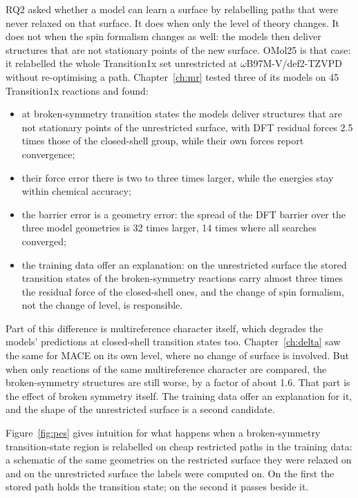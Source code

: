 RQ2 asked whether a model can learn a surface by relabelling paths
that were never relaxed on that surface. It does when only the level
of theory changes. It does not when the spin formalism changes as
well: the models then deliver structures that are not stationary
points of the new surface. OMol25 is
that case: it relabelled the whole Transition1x set unrestricted at
\mbox{$\omega$B97M-V/def2-TZVPD} without re-optimising a path.
Chapter~\ref{ch:mr} tested three of its models on 45 Transition1x
reactions and found:

\begin{itemize}
  \item at broken-symmetry transition states the models deliver
    structures that are not stationary points of the unrestricted
    surface, with DFT residual forces 2.5 times those of the
    closed-shell group, while their own forces report convergence;
  \item their force error there is two to three times larger, while
    the energies stay within chemical accuracy;
  \item the barrier error is a geometry error: the spread of the DFT
    barrier over the three model geometries is 32 times larger, 14
    times where all searches converged;
  \item the training data offer an explanation: on the unrestricted
    surface the stored transition states of the broken-symmetry
    reactions carry almost three times the residual force of the
    closed-shell ones, and the change of spin formalism, not the
    change of level, is responsible.
\end{itemize}

Part of this difference is multireference character itself, which
degrades the models' predictions at closed-shell transition states
too. Chapter~\ref{ch:delta} saw the same for MACE on its own level,
where no change of surface is involved. But when only reactions of the
same multireference character are
compared, the broken-symmetry structures are still worse, by a factor
of about 1.6. That part is the effect of broken symmetry itself. The
training data offer an explanation for it, and the shape of the
unrestricted surface is a second candidate.

Figure~\ref{fig:pes} gives intuition for what happens when a
broken-symmetry transition-state region is relabelled on cheap
restricted paths in the training data: a schematic of the same
geometries on the restricted surface they were relaxed on and on the
unrestricted surface the labels were computed on. On the first the
stored path holds the transition state; on the second it passes
beside it.

